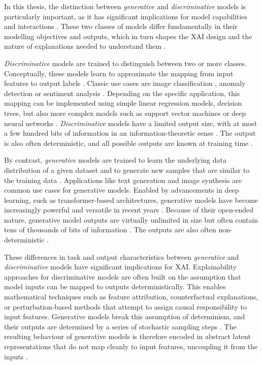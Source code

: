 In this thesis, the distinction between \textit{generative} and \textit{discriminative} models is particularly important, as it has significant implications for model capabilities and interactions \parencite{Schneider2024}. These two classes of models differ fundamentally in their modelling objectives and outputs, which in turn shapes the \ac{XAI} design and the nature of explanations needed to understand them \parencite{Kumarage2026}.

\textit{Discriminative} models are trained to distinguish between two or more classes. Conceptually, these models learn to approximate the mapping from input features to output labels \parencite{Kumarage2026}. Classic use cases are image classification \parencite[e.g.,][]{Lu2007}, anomaly detection \parencite[e.g.,][]{Edozie2025} or sentiment analysis \parencite[e.g.,][]{Wankhade2022}. Depending on the specific application, this mapping can be implemented using simple linear regression models, decision trees, but also more complex models such as support vector machines or deep neural networks \parencite{Schneider2024}. \textit{Discriminative} models have a limited output size, with at most a few hundred bits of information in an information-theoretic sense \parencite{Schneider2024}. The output is also often deterministic, and all possible outputs are known at training time \parencite{Kumarage2026}.

By contrast, \textit{generative} models are trained to learn the underlying data distribution of a given dataset and to generate new samples that are similar to the training data \parencite{Banh2023}. Applications like text generation \parencite[e.g.,][]{Brown2020} and image synthesis \parencite[e.g.,][]{Rombach2022} are common use cases for generative models. Enabled by advancements in deep learning, such as transformer-based architectures, generative models have become increasingly powerful and versatile in recent years \parencite[e.g.,][]{OpenAI2025a}. Because of their open-ended nature, generative model outputs are virtually unlimited in size but often contain tens of thousands of bits of information \parencite{Schneider2024}. The outputs are also often non-deterministic \parencite{Kumarage2026}.

These differences in task and output characteristics between \textit{generative} and \textit{discriminative} models have significant implications for \ac{XAI}. Explainability approaches for discriminative models are often built on the assumption that model inputs can be mapped to outputs deterministically. This enables mathematical techniques such as feature attribution, counterfactual explanations, or perturbation-based methods \parencite{Kumarage2026} that attempt to assign causal responsibility to input features. Generative models break this assumption of determinism, and their outputs are determined by a series of stochastic sampling steps \parencite{Kumarage2026}. The resulting behaviour of generative models is therefore encoded in abstract latent representations that do not map cleanly to input features, uncoupling it from the inputs \parencite{Schneider2024}.

